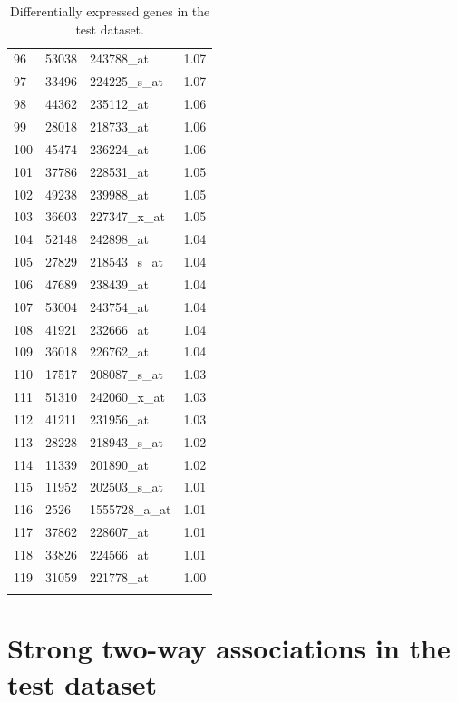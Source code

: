 \documentclass[a4paper, 12pt]{report}
\begin{document}
\begin{footnotesize}
\begin{longtable}{|>{}m{1cm} |>{}m{2cm} | >{}m{5cm}| >{}m{4cm} | }
  96 & 53038 & 243788\_at & 1.07 \\ 
  97 & 33496 & 224225\_s\_at & 1.07 \\ 
  98 & 44362 & 235112\_at & 1.06 \\ 
  99 & 28018 & 218733\_at & 1.06 \\ 
  100 & 45474 & 236224\_at & 1.06 \\ 
  101 & 37786 & 228531\_at & 1.05 \\ 
  102 & 49238 & 239988\_at & 1.05 \\ 
  103 & 36603 & 227347\_x\_at & 1.05 \\ 
  104 & 52148 & 242898\_at & 1.04 \\ 
  105 & 27829 & 218543\_s\_at & 1.04 \\ 
  106 & 47689 & 238439\_at & 1.04 \\ 
  107 & 53004 & 243754\_at & 1.04 \\ 
  108 & 41921 & 232666\_at & 1.04 \\ 
  109 & 36018 & 226762\_at & 1.04 \\ 
  110 & 17517 & 208087\_s\_at & 1.03 \\ 
  111 & 51310 & 242060\_x\_at & 1.03 \\ 
  112 & 41211 & 231956\_at & 1.03 \\ 
  113 & 28228 & 218943\_s\_at & 1.02 \\ 
  114 & 11339 & 201890\_at & 1.02 \\ 
  115 & 11952 & 202503\_s\_at & 1.01 \\ 
  116 & 2526 & 1555728\_a\_at & 1.01 \\ 
  117 & 37862 & 228607\_at & 1.01 \\ 
  118 & 33826 & 224566\_at & 1.01 \\ 
  119 & 31059 & 221778\_at & 1.00 \\ 
   \hline
\caption{Differentially expressed genes in the test dataset.} 
\label{T:bigDE}
\end{longtable}
\end{footnotesize}

\newpage
\section{Strong two-way associations in the test dataset}
\end{document}
